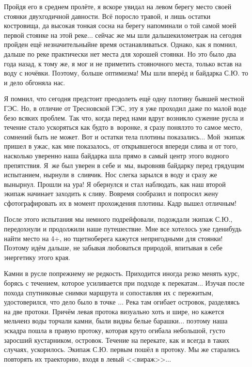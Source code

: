 Пройдя его в среднем пролёте, я вскоре увидал на левом берегу место своей стоянки двухгодичной давности. Всё поросло травой, и лишь остатки костровища, да высокая тонкая сосна на берегу напоминали о той самой моей первой стоянке на этой реке$\ldots$ сейчас же мы шли дальше\mdash километраж на сегодня пройден ещё незначительный\mdash  не время останавливаться. Однако, как я помнил, дальше по реке практически нет места для хорошей стоянки. Но это было два года назад, к тому же, я мог и не приметить стояночного места, только встав на воду с ночёвки. Поэтому, больше оптимизма! Мы шли вперёд и байдарка С.Ю. то и дело обгоняла нас. 

Я помнил, что сегодня предстоит преодолеть ещё одну плотину бывшей местной ГЭС. Но, в отличие от Тресновской ГЭС, эту я уже проходил даже по малой воде безо всяких проблем. Так что, когда перед нами вдруг возникло сужение русла и течение стало ускоряться как будто в~воронке, я сразу понял\mdash это то самое место, сомнений быть не может. Вот и остатки тела плотины показались$\ldots$ Мой~экипаж пришел в ужас, как мне показалось, от открывшегося впереди слива и от того, насколько уверенно наша байдарка шла прямо в самый центр этого водного препятствия. Я~же был уверен в себе и~мы, выровняв байдарку перед грядущим испытанием, нырнули в~сливчик. Нос слегка зарылся в воду и сразу же вынырнул. Прошли на ура! Я обернулся и стал наблюдать, как наш второй экипаж начинает заходить к сливу. Вовремя сообразил и попросил жену сфотографировать их в момент прохождения плотины. Кадр вышел отличным!

После этого испытания мы немного подрейфовали, подождали экипаж С.Ю., передохнули и продолжили наше путешествие. Мне все хотелось уже где\sdash нибудь найти место на 4+, но тщетно\mdash берега кажутся непригодными для стоянки! Поэтому идём дальше, не забывая любоваться природой, впитывая в себе энергетику этого края.

Камни в русле по\sdash прежнему не редкость. Приходится иногда резко менять курс, борясь с течением, которое усиливается при подходе к перекатам$\ldots$ Изучая после похода спутниковые снимки маршрута и сопоставляя их с пережитым, удостоверился, что дело было в точке \CoordsLidRightProtoka$\ldots$ Река там огибает островок, разделяясь на две протоки. Причём левая протока визуально хоть и шире, но кажется мельче\mdash из воды торчали камни, были видны белые барашки$\ldots$ поэтому наша эскадра пошла в правую протоку, которая круто огибала небольшой, густо заросший кустарником, островок. Течение на перекате, как и всегда в таких случаях, ускорилось. Экипаж С.Ю. первым пошёл в протоку. Мы же старались повторять их траекторию, входя в левый <<вираж>>$\ldots$ 

